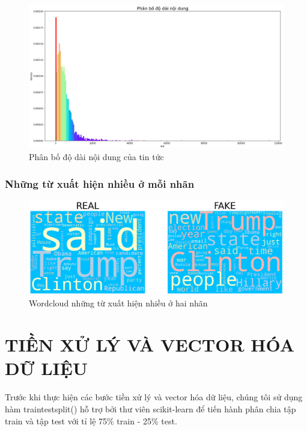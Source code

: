 \documentclass[12pt,a4paper,oneside]{book}
\begin{document}
				\begin{figure}[H]
					\begin{center}
						\includegraphics[width=1\columnwidth]{textlen}
					\end{center}
					\caption{Phân bố độ dài nội dung của tin tức}
				\end{figure}
				
	\subsection{Những từ xuất hiện nhiều ở mỗi nhãn}
				\begin{figure}[H]
					\begin{center}
						\includegraphics[width=1\columnwidth]{wordcloud}
					\end{center}
					\caption{Wordcloud những từ xuất hiện nhiều ở hai nhãn}
				\end{figure}


\chapter{TIỀN XỬ LÝ VÀ VECTOR HÓA DỮ LIỆU}
	
	Trước khi thực hiện các bước tiền xử lý và vector hóa dữ liệu, chúng tôi sử dụng hàm traintestsplit() hỗ trợ bởi thư viên scikit-learn để tiến hành phân chia tập train và tập test với tỉ lệ 75\% train - 25\% test. 
	
\end{document}

